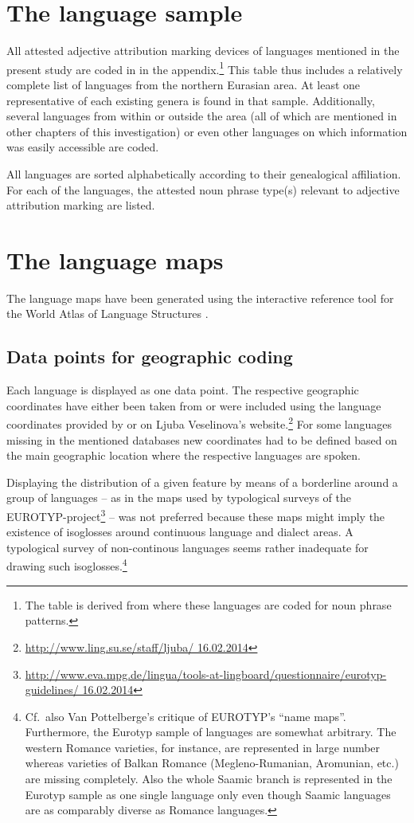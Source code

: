 \section{The language sample}
All attested adjective attribution marking devices of languages mentioned in the present study are coded in  in the appendix.\footnote{The table is derived from \citet{AUTOTYP-NP} where these languages are coded for noun phrase patterns.} This table thus includes a relatively complete list of languages from the northern Eurasian area. At least one representative of each existing genera is found in that sample. Additionally, several languages from within or outside the area (all of which are mentioned in other chapters of this investigation) or even other languages on which information was easily accessible are coded.

All languages are sorted alphabetically according to their genealogical affiliation. For each of the languages, the attested noun phrase type(s) relevant to adjective attribution marking are listed.

\section{The language maps}
The language maps have been generated using the interactive reference tool 
for the World Atlas of Language Structures \citep{bibiko2005}. 

\subsection[Geographic coding]{Data points for geographic coding}
Each language is displayed as one data point. The respective geographic coordinates have either been taken from \cite{WALS} or were included using the language coordinates provided by \cite{AUTOTYP} or on Ljuba Veselinova's website.\footnote{\url{http://www.ling.su.se/staff/ljuba/ 16.02.2014}} For some languages missing in the mentioned databases new coordinates had to be defined based on the main geographic location where the respective languages are spoken.

Displaying the distribution of a given feature by means of a borderline around a group of languages – as in the maps used by typological surveys of the EUROTYP-project\footnote{\url{http://www.eva.mpg.de/lingua/tools-at-lingboard/questionnaire/eurotyp-guidelines/ 16.02.2014}} – was not preferred because these maps might imply the existence of isoglosses around continuous language and dialect areas. A typological survey of non-continous languages seems rather inadequate for drawing such isoglosses.\footnote{Cf.~also Van Pottelberge's \citeyear{van-pottelberge2001} critique of EUROTYP's “name maps”. Furthermore, the Eurotyp sample of languages are somewhat arbitrary. The western Romance varieties, for instance, are represented in large number whereas varieties of Balkan Romance (Megleno-Rumanian, Aromunian, etc.) are missing completely. Also the whole Saamic branch is represented in the Eurotyp sample as one single language only even though Saamic languages are as comparably diverse as Romance languages.}

